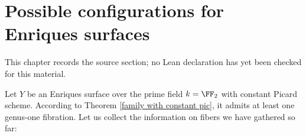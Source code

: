 \chapter{Possible configurations for Enriques surfaces}
\label{no-enriques-surface-over-the-integers-chapter-12}

\begin{remark}
\label{no-enriques-surface-over-the-integers-chapter-12-source}
This chapter records the source section; no Lean declaration has yet been checked for this material.
\notready
\end{remark}

\label{Possible configurations}

Let $Y$ be an Enriques surface over the prime field $k=\FF_2$ with constant Picard scheme.
According to Theorem \ref{family with constant pic}, it admits at least one genus-one fibration.
Let us collect the information on   fibers we have gathered so far:


